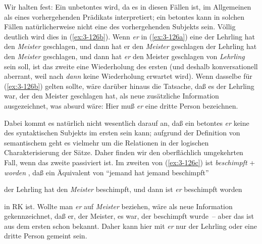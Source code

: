 \documentclass[output=paper]{langsci/langscibook}
\begin{document}
Wir halten fest: Ein unbetontes  wird, da es in diesen Fällen
 ist, im Allgemeinen als  eines vorhergehenden Prädikats
interpretiert; ein betontes  kann in solchen Fällen
natürlicherweise nicht eine  des vorhergehenden Subjekts
sein. Völlig deutlich wird dies in (\ref{ex:3-126b}). Wenn \textit{er} in (\ref{ex:3-126a}) eine
\eal
\label{ex:3-126}
\ex
\label{ex:3-126a}
der Lehrling hat den \textit{Meister} geschlagen, und dann hat er den \textit{Meister} geschlagen
\ex
\label{ex:3-126b}
der Lehrling hat den \textit{Meister} geschlagen, und dann hat \textit{er} den Meister geschlagen
\zl
{} von \textit{Lehrling} sein soll, ist das zweite  eine
Wiederholung des ersten (und deshalb konversationell aberrant, weil
nach \textit{dann} keine Wiederholung erwartet wird). Wenn dasselbe für (\ref{ex:3-126b}) gelten sollte, wäre darüber hinaus die Tatsache, daß es der Lehrling
war, der den Meister geschlagen hat, als neue zusätzliche Information
ausgezeichnet, was absurd wäre: Hier muß \textit{er} eine dritte Person
bezeichnen.

Dabei kommt es natürlich nicht wesentlich darauf an, daß ein betontes
\textit{er} keine  des syntaktischen Subjekts im ersten  sein
kann; aufgrund der Definition von semantischem  geht es vielmehr
um die Relationen in der logischen Charakterisierung der Sätze. Daher
finden wir den oberflächlich umgekehrten Fall, wenn das zweite
 passiviert ist. Im zweiten  von (\ref{ex:3-126c}) ist
\textit{beschimpft} + \textit{worden} , \dash daß ein Äquivalent von "`jemand hat
jemand beschimpft"'
\begin{exe}
\label{ex:3-126-2}
\begin{xlist}
\label{ex:3-126c} der Lehrling hat den \textit{Meister} beschimpft, und dann ist \textit{er} beschimpft worden
\end{xlist}
\end{exe}
in RK ist. Wollte man \textit{er} auf \emph{Meister} beziehen, wäre als neue
Information gekennzeichnet, daß er, der Meister, es war, der
beschimpft wurde~-- aber das ist aus dem ersten  schon
bekannt. Daher kann hier mit \textit{er} nur der Lehrling oder eine
dritte Person gemeint sein.
\end{document}

